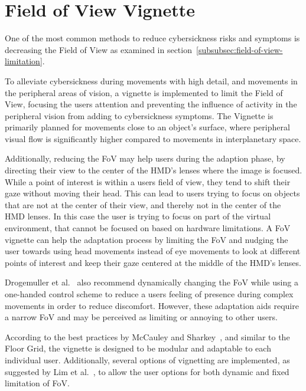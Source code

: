 \section{Field of View Vignette}\label{sec:field-of-view-vignette}

One of the most common methods to reduce cybersickness risks and symptoms is decreasing the Field of
View as examined in section~\ref{subsubsec:field-of-view-limitation}.

To alleviate cybersickness during movements with high detail, and movements in the peripheral areas of vision, a
vignette is implemented to limit the Field of View, focusing the users attention and preventing the influence of
activity in the peripheral vision from adding to cybersickness symptoms.
The Vignette is primarily planned for movements close to an object's surface, where peripheral visual flow is
significantly higher compared to movements in interplanetary space.

Additionally, reducing the FoV may help users during the adaption phase, by directing their view to the center of the
HMD's lenses where the image is focused.
While a point of interest is within a users field of view, they tend to shift their gaze without moving their head.
This can lead to users trying to focus on objects that are not at the center of their view, and thereby not in the
center of the HMD lenses.
In this case the user is trying to focus on part of the virtual environment, that cannot be focused on based on
hardware limitations.
A FoV vignette can help the adaptation process by limiting the FoV and nudging the user towards using head movements
instead of eye movements to look at different points of interest and keep their gaze centered at the middle of the
HMD's lenses.

Drogemuller et al.~\cite{Drogemuller2020} also recommend dynamically changing the FoV while using a one-handed
control scheme to reduce a users feeling of presence during complex movements in order to reduce discomfort.
However, these adaptation aids require a narrow FoV and may be perceived as limiting or annoying to other users.

According to the best practices by McCauley and Sharkey~\cite{McCauley1992}, and similar to the Floor Grid, the
vignette is designed to be modular and adaptable to each individual user.
Additionally, several options of vignetting are implemented, as suggested by Lim et al.~\cite{Lim2020}, to allow the
user options for both dynamic and fixed limitation of FoV\@.


